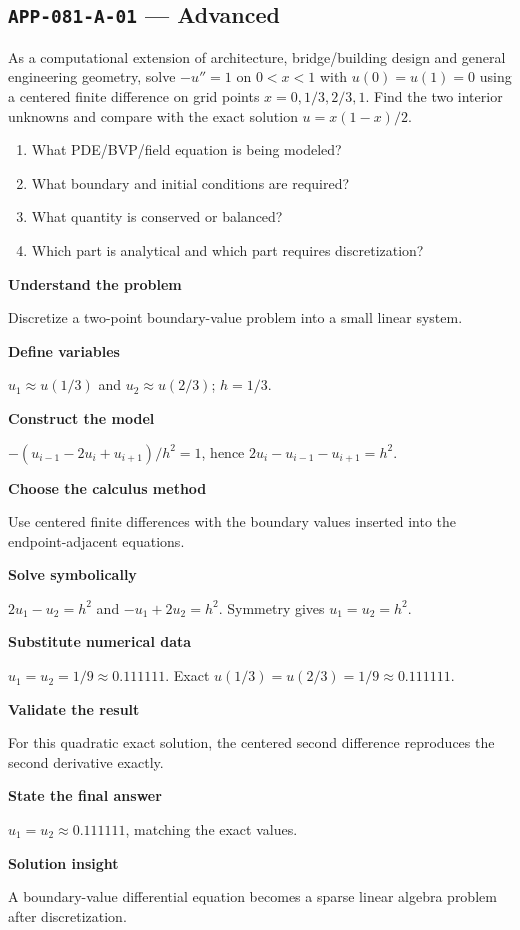\documentclass[11pt]{book}
\newcommand{\pid}[1]{\texttt{#1}}
\begin{document}
\subsection*{\pid{APP-081-A-01} — Advanced}
\begin{problembox}
As a computational extension of architecture, bridge/building design and general engineering geometry, solve $-u''=1$ on $0<x<1$ with $u(0)=u(1)=0$ using a centered finite difference on grid points $x=0,1/3,2/3,1$. Find the two interior unknowns and compare with the exact solution $u=x(1-x)/2$.
\end{problembox}
\begin{promptbox}\begin{enumerate}
\item What PDE/BVP/field equation is being modeled?
\item What boundary and initial conditions are required?
\item What quantity is conserved or balanced?
\item Which part is analytical and which part requires discretization?
\end{enumerate}\end{promptbox}
\begin{solutionbox}
\textbf{Understand the problem}\par Discretize a two-point boundary-value problem into a small linear system.\par\medskip
\textbf{Define variables}\par $u_1\approx u(1/3)$ and $u_2\approx u(2/3)$; $h=1/3$.\par\medskip
\textbf{Construct the model}\par $-(u_{i-1}-2u_i+u_{i+1})/h^2=1$, hence $2u_i-u_{i-1}-u_{i+1}=h^2$.\par\medskip
\textbf{Choose the calculus method}\par Use centered finite differences with the boundary values inserted into the endpoint-adjacent equations.\par\medskip
\textbf{Solve symbolically}\par $2u_1-u_2=h^2$ and $-u_1+2u_2=h^2$. Symmetry gives $u_1=u_2=h^2$.\par\medskip
\textbf{Substitute numerical data}\par $u_1=u_2=1/9\approx 0.111111$. Exact $u(1/3)=u(2/3)=1/9\approx 0.111111$.\par\medskip
\textbf{Validate the result}\par For this quadratic exact solution, the centered second difference reproduces the second derivative exactly.\par\medskip
\textbf{State the final answer}\par $u_1=u_2\approx 0.111111$, matching the exact values.\par\medskip
\textbf{Solution insight}\par A boundary-value differential equation becomes a sparse linear algebra problem after discretization.\par\medskip
\end{solutionbox}
\end{document}
